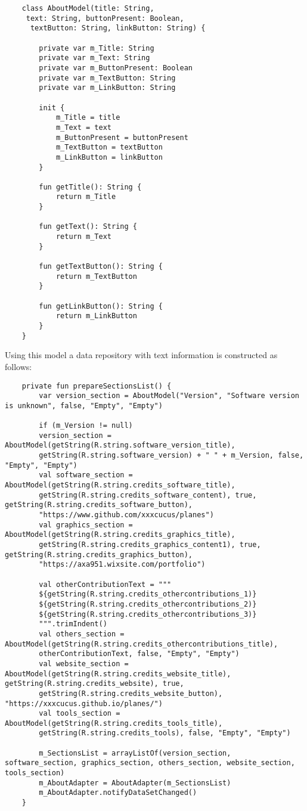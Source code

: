 \begin{lstlisting}
	class AboutModel(title: String,
	 text: String, buttonPresent: Boolean,
	  textButton: String, linkButton: String) {
		
		private var m_Title: String
		private var m_Text: String
		private var m_ButtonPresent: Boolean
		private var m_TextButton: String
		private var m_LinkButton: String
		
		init {
			m_Title = title
			m_Text = text
			m_ButtonPresent = buttonPresent
			m_TextButton = textButton
			m_LinkButton = linkButton
		}
		
		fun getTitle(): String {
			return m_Title
		}
		
		fun getText(): String {
			return m_Text
		}
		
		fun getTextButton(): String {
			return m_TextButton
		}
		
		fun getLinkButton(): String {
			return m_LinkButton
		}
	}
\end{lstlisting}

Using this model a data repository with text information is constructed as follows:

\begin{lstlisting}
	private fun prepareSectionsList() {
		var version_section = AboutModel("Version", "Software version is unknown", false, "Empty", "Empty")
		
		if (m_Version != null)
		version_section = AboutModel(getString(R.string.software_version_title),
		getString(R.string.software_version) + " " + m_Version, false, "Empty", "Empty")
		val software_section = AboutModel(getString(R.string.credits_software_title),
		getString(R.string.credits_software_content), true, getString(R.string.credits_software_button),
		"https://www.github.com/xxxcucus/planes")
		val graphics_section = AboutModel(getString(R.string.credits_graphics_title),
		getString(R.string.credits_graphics_content1), true, getString(R.string.credits_graphics_button),
		"https://axa951.wixsite.com/portfolio")
		
		val otherContributionText = """
		${getString(R.string.credits_othercontributions_1)}
		${getString(R.string.credits_othercontributions_2)}
		${getString(R.string.credits_othercontributions_3)}
		""".trimIndent()
		val others_section = AboutModel(getString(R.string.credits_othercontributions_title),
		otherContributionText, false, "Empty", "Empty")
		val website_section = AboutModel(getString(R.string.credits_website_title), getString(R.string.credits_website), true,
		getString(R.string.credits_website_button), "https://xxxcucus.github.io/planes/")
		val tools_section = AboutModel(getString(R.string.credits_tools_title),
		getString(R.string.credits_tools), false, "Empty", "Empty")
		
		m_SectionsList = arrayListOf(version_section, software_section, graphics_section, others_section, website_section, tools_section)
		m_AboutAdapter = AboutAdapter(m_SectionsList)
		m_AboutAdapter.notifyDataSetChanged()
	}
\end{lstlisting}

